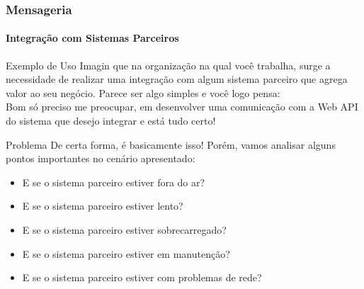 \documentclass[
	9pt, %
	t, %
]{beamer}
\begin{document}
\begin{frame}
	\frametitle{Mensageria}
	\framesubtitle{Integração com Sistemas Parceiros}

	\begin{block}{Exemplo de Uso}
		Imagin que na organização na qual você trabalha, surge a necessidade de realizar uma integração com algum sistema parceiro que agrega valor ao seu negócio. Parece ser algo simples e você logo pensa:
		\\ \bigskip
		\alert{Bom só preciso me preocupar, em desenvolver uma comunicação com a Web API do sistema que desejo integrar e está tudo certo!}

	\end{block}

	\begin{block}{Problema}
		De certa forma, é basicamente isso! Porém, vamos analisar alguns pontos importantes no cenário apresentado:
		\begin{itemize}
			\item E se o sistema parceiro estiver fora do ar?
			\item E se o sistema parceiro estiver lento?
			\item E se o sistema parceiro estiver sobrecarregado?
			\item E se o sistema parceiro estiver em manutenção?
			\item E se o sistema parceiro estiver com problemas de rede?
		\end{itemize}
	\end{block}

\end{frame}
\end{document}
